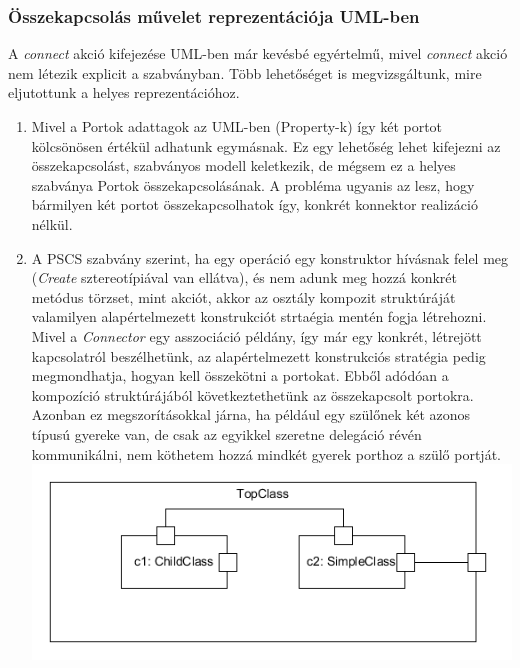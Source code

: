 \documentclass[a4paper,12pt]{report}
\begin{document}
\subsubsection{Összekapcsolás művelet reprezentációja UML-ben}
A \textit{connect} akció kifejezése UML-ben már kevésbé egyértelmű, mivel \textit{connect} akció nem létezik explicit a szabványban. Több lehetőséget is megvizsgáltunk, mire eljutottunk a helyes reprezentációhoz.
\begin{enumerate}
\item Mivel a Portok adattagok az UML-ben (Property-k) így két portot kölcsönösen értékül adhatunk egymásnak. Ez egy lehetőség lehet kifejezni az összekapcsolást, szabványos modell keletkezik, de mégsem ez a helyes szabványa Portok összekapcsolásának. A probléma ugyanis az lesz, hogy bármilyen két portot összekapcsolhatok így, konkrét konnektor realizáció nélkül.
\item A PSCS szabvány szerint, ha egy operáció egy konstruktor hívásnak felel meg (\textit{Create} sztereotípiával van ellátva), és nem adunk meg hozzá konkrét metódus törzset, mint akciót, akkor az osztály kompozit struktúráját valamilyen alapértelmezett konstrukciót strtaégia mentén fogja létrehozni. Mivel a \textit{Connector} egy asszociáció példány, így már egy konkrét, létrejött kapcsolatról beszélhetünk, az alapértelmezett konstrukciós stratégia pedig megmondhatja, hogyan kell összekötni a portokat. Ebből adódóan a kompozíció struktúrájából következtethetünk az összekapcsolt portokra. Azonban ez megszorításokkal járna, ha például egy szülőnek két azonos típusú gyereke van, de csak az egyikkel szeretne delegáció révén kommunikálni, nem köthetem hozzá mindkét gyerek porthoz a szülő portját.  \\
\includegraphics[scale=0.8]{preconnect_problem.png}

\end{enumerate}
\end{document}
